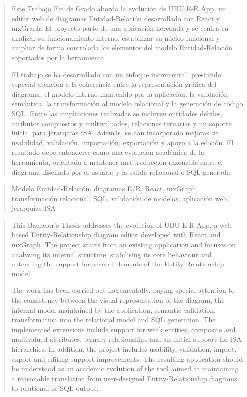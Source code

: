 \documentclass[a4paper,12pt,twoside]{memoir}
\begin{document}
\frontmatter

\renewcommand*\abstractname{Resumen}
\begin{abstract}
Este Trabajo Fin de Grado aborda la evolución de UBU E-R App, un editor web de diagramas Entidad-Relación desarrollado con React y mxGraph. El proyecto parte de una aplicación heredada y se centra en analizar su funcionamiento interno, estabilizar su núcleo funcional y ampliar de forma controlada los elementos del modelo Entidad-Relación soportados por la herramienta.

El trabajo se ha desarrollado con un enfoque incremental, prestando especial atención a la coherencia entre la representación gráfica del diagrama, el modelo interno mantenido por la aplicación, la validación semántica, la transformación al modelo relacional y la generación de código SQL. Entre las ampliaciones realizadas se incluyen entidades débiles, atributos compuestos y multivaluados, relaciones ternarias y un soporte inicial para jerarquías ISA. Además, se han incorporado mejoras de usabilidad, validación, importación, exportación y apoyo a la edición. El resultado debe entenderse como una evolución académica de la herramienta, orientada a mantener una traducción razonable entre el diagrama diseñado por el usuario y la salida relacional o SQL generada.
\end{abstract}

\renewcommand*\abstractname{Descriptores}
\begin{abstract}
Modelo Entidad-Relación, diagramas E/R, React, mxGraph, transformación relacional, SQL, validación de modelos, aplicación web, jerarquías ISA
\end{abstract}

\clearpage

\renewcommand*\abstractname{Abstract}
\begin{abstract} This Bachelor's Thesis addresses the evolution of UBU E-R App, a web-based Entity-Relationship diagram editor developed with React and mxGraph. The project starts from an existing application and focuses on analysing its internal structure, stabilising its core behaviour and extending the support for several elements of the Entity-Relationship model.

The work has been carried out incrementally, paying special attention to the consistency between the visual representation of the diagram, the internal model maintained by the application, semantic validation, transformation into the relational model and SQL generation. The implemented extensions include support for weak entities, composite and multivalued attributes, ternary relationships and an initial support for ISA hierarchies. In addition, the project includes usability, validation, import, export and editing-support improvements. The resulting application should be understood as an academic evolution of the tool, aimed at maintaining a reasonable translation from user-designed Entity-Relationship diagrams to relational or SQL output.
\end{abstract}
\end{document}
